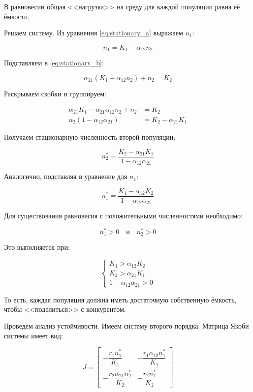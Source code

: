 \documentclass[a4paper, 14pt]{extarticle}
\begin{document}
В равновесии общая <<нагрузка>> на среду для каждой популяции равна её ёмкости.

Решаем систему. Из уравнения \eqref{eq:stationary_a} выражаем \(n_1\):

\[
n_1 = K_1 - \alpha_{12} n_2
\]

Подставляем в \eqref{eq:stationary_b}:

\[
\alpha_{21}(K_1 - \alpha_{12} n_2) + n_2 = K_2
\]

Раскрываем скобки и группируем:

\begin{align}
    \alpha_{21} K_1 - \alpha_{21} \alpha_{12} n_2 + n_2 &= K_2 \nonumber \\
    n_2 (1 - \alpha_{12} \alpha_{21}) &= K_2 - \alpha_{21} K_1 \nonumber
\end{align}

Получаем стационарную численность второй популяции:

\begin{equation}
n_2^* = \dfrac{K_2 - \alpha_{21} K_1}{1 - \alpha_{12} \alpha_{21}} \label{eq:n2_star}
\end{equation}

Аналогично, подставляя в уравнение для \(n_1\):

\begin{equation}
n_1^* = \dfrac{K_1 - \alpha_{12} K_2}{1 - \alpha_{12} \alpha_{21}} \label{eq:n1_star}
\end{equation}

Для существования равновесия с положительными численностями необходимо:

\[
n_1^* > 0 \quad \text{и} \quad n_2^* > 0
\]

Это выполняется при:

\begin{equation}
\begin{cases}
K_1 > \alpha_{12} K_2 \\
K_2 > \alpha_{21} K_1 \\
1 - \alpha_{12} \alpha_{21} > 0
\end{cases}
\label{eq:coexistence_conditions}
\end{equation}

То есть, каждая популяция должна иметь достаточную собственную ёмкость, чтобы <<поделиться>> с конкурентом.

Проведём анализ устойчивости. Имеем систему второго порядка. Матрица Якоби системы имеет вид:

\begin{equation}
J = \begin{bmatrix}
-\dfrac{r_1 n_1^*}{K_1} & -\dfrac{r_1 \alpha_{12} n_1^*}{K_1} \\[0.5em]
-\dfrac{r_2 \alpha_{21} n_2^*}{K_2} & -\dfrac{r_2 n_2^*}{K_2}
\end{bmatrix}
\label{eq:jacobian_matrix}
\end{equation}
\end{document}
